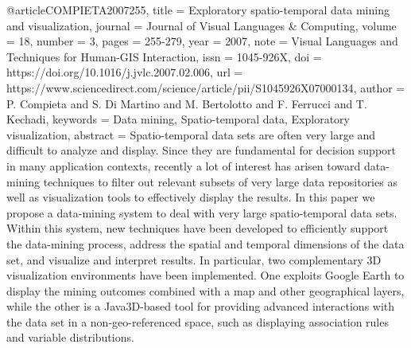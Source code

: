 @article{COMPIETA2007255,
title = {Exploratory spatio-temporal data mining and visualization},
journal = {Journal of Visual Languages & Computing},
volume = {18},
number = {3},
pages = {255-279},
year = {2007},
note = {Visual Languages and Techniques for Human-GIS Interaction},
issn = {1045-926X},
doi = {https://doi.org/10.1016/j.jvlc.2007.02.006},
url = {https://www.sciencedirect.com/science/article/pii/S1045926X07000134},
author = {P. Compieta and S. {Di Martino} and M. Bertolotto and F. Ferrucci and T. Kechadi},
keywords = {Data mining, Spatio-temporal data, Exploratory visualization},
abstract = {Spatio-temporal data sets are often very large and difficult to analyze and display. Since they are fundamental for decision support in many application contexts, recently a lot of interest has arisen toward data-mining techniques to filter out relevant subsets of very large data repositories as well as visualization tools to effectively display the results. In this paper we propose a data-mining system to deal with very large spatio-temporal data sets. Within this system, new techniques have been developed to efficiently support the data-mining process, address the spatial and temporal dimensions of the data set, and visualize and interpret results. In particular, two complementary 3D visualization environments have been implemented. One exploits Google Earth to display the mining outcomes combined with a map and other geographical layers, while the other is a Java3D-based tool for providing advanced interactions with the data set in a non-geo-referenced space, such as displaying association rules and variable distributions.}
}